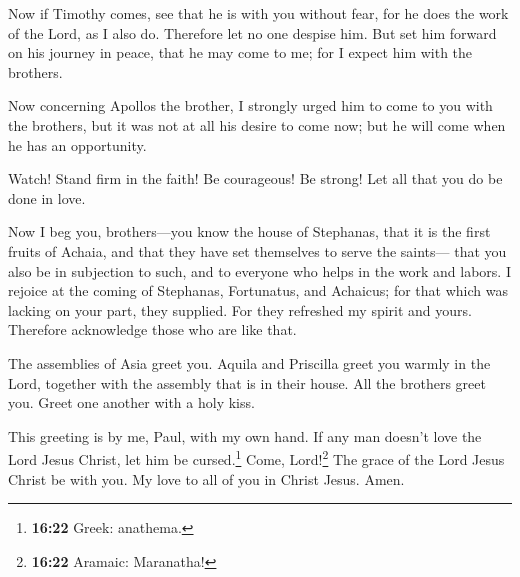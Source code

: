  Now if Timothy comes, see that he is with you without
fear, for he does the work of the Lord, as I also do. 
Therefore let no one despise him. But set him forward on his journey in
peace, that he may come to me; for I expect him with the brothers.

 Now concerning Apollos the brother, I strongly urged him
to come to you with the brothers, but it was not at all his desire to
come now; but he will come when he has an opportunity.

 Watch! Stand firm in the faith! Be courageous! Be
strong!  Let all that you do be done in love.

 Now I beg you, brothers---you know the house of
Stephanas, that it is the first fruits of Achaia, and that they have set
themselves to serve the saints---  that you also be in
subjection to such, and to everyone who helps in the work and labors.
 I rejoice at the coming of Stephanas, Fortunatus, and
Achaicus; for that which was lacking on your part, they supplied.
 For they refreshed my spirit and yours. Therefore
acknowledge those who are like that.

 The assemblies of Asia greet you. Aquila and Priscilla
greet you warmly in the Lord, together with the assembly that is in
their house.  All the brothers greet you. Greet one
another with a holy kiss.

 This greeting is by me, Paul, with my own hand.
 If any man doesn't love the Lord Jesus Christ, let him
be cursed.\footnote{\textbf{16:22} Greek: anathema.} Come,
Lord!\footnote{\textbf{16:22} Aramaic: Maranatha!}  The
grace of the Lord Jesus Christ be with you.  My love to
all of you in Christ Jesus. Amen.
